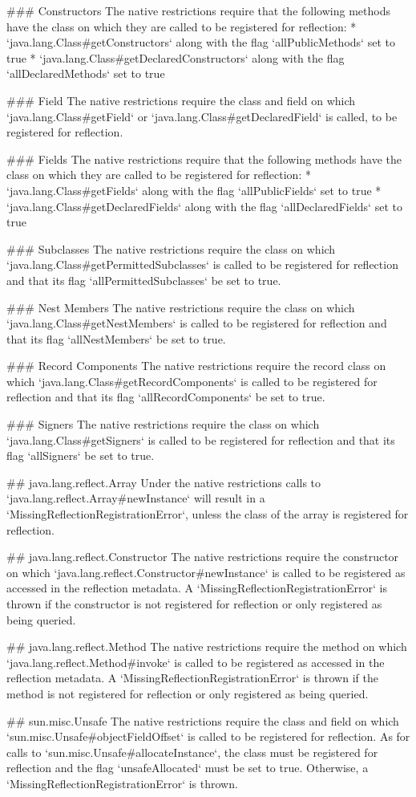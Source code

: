 ### Constructors
The native restrictions require that the following methods have the class on which they are called to be registered for reflection:
* `java.lang.Class#getConstructors` along with the flag `allPublicMethods` set to true
* `java.lang.Class#getDeclaredConstructors` along with the flag `allDeclaredMethods` set to true

### Field
The native restrictions require the class and field on which `java.lang.Class#getField` or
`java.lang.Class#getDeclaredField` is called, to be registered for reflection.

### Fields
The native restrictions require that the following methods have the class on which they are called to be registered for reflection:
* `java.lang.Class#getFields` along with the flag `allPublicFields` set to true
* `java.lang.Class#getDeclaredFields` along with the flag `allDeclaredFields` set to true

### Subclasses
The native restrictions require the class on which `java.lang.Class#getPermittedSubclasses` is called to be registered
for reflection and that its flag `allPermittedSubclasses` be set to true. 

### Nest Members
The native restrictions require the class on which `java.lang.Class#getNestMembers` is called to be registered
for reflection and that its flag `allNestMembers` be set to true. 

### Record Components
The native restrictions require the record class on which `java.lang.Class#getRecordComponents` is called to be registered
for reflection and that its flag `allRecordComponents` be set to true. 

### Signers
The native restrictions require the class on which `java.lang.Class#getSigners` is called to be registered
for reflection and that its flag `allSigners` be set to true. 


## java.lang.reflect.Array
Under the native restrictions calls to `java.lang.reflect.Array#newInstance` will 
result in a `MissingReflectionRegistrationError`, unless the class of the array is registered for 
reflection.

## java.lang.reflect.Constructor
The native restrictions require the constructor on which `java.lang.reflect.Constructor#newInstance` is called
to be registered as accessed in the reflection metadata. A `MissingReflectionRegistrationError` is thrown if the 
constructor is not registered for reflection or only registered as being queried.

## java.lang.reflect.Method
The native restrictions require the method on which `java.lang.reflect.Method#invoke` is called
to be registered as accessed in the reflection metadata. A `MissingReflectionRegistrationError` is thrown if the 
method is not registered for reflection or only registered as being queried.

## sun.misc.Unsafe
The native restrictions require the class and field on which `sun.misc.Unsafe#objectFieldOffset` is called 
to be registered for reflection.
As for calls to `sun.misc.Unsafe#allocateInstance`, the class must be registered for reflection and the flag 
`unsafeAllocated` must be set to true. 
Otherwise, a `MissingReflectionRegistrationError` is thrown.
